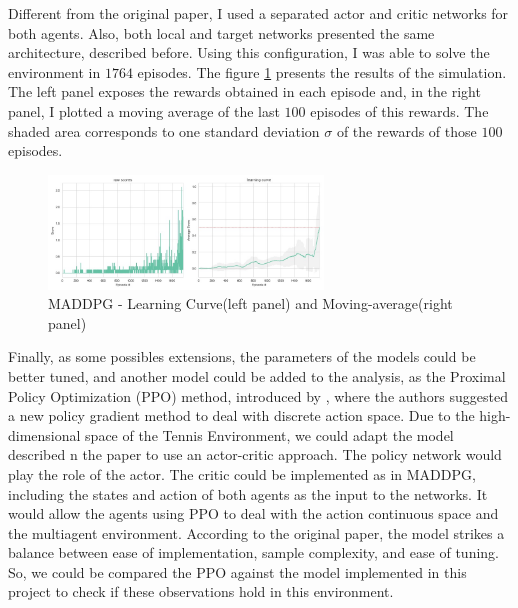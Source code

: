 \documentclass[a4paper]{article}
\begin{document}

Different from the original paper, I used a separated actor and critic networks for both agents. Also, both local and target networks presented the same architecture, described before. Using this configuration, I was able to solve the environment in $1764$ episodes. The figure \ref{fig:ddpg} presents the results of the simulation. The left panel exposes the rewards obtained in each episode and, in the right panel, I plotted a moving average of the last $100$ episodes of this rewards. The shaded area corresponds to one standard deviation $\sigma$ of the rewards of those $100$ episodes.

\begin{figure}[ht]
\centering
\includegraphics[width=0.65\textwidth]{../notebooks/figures/2018-11-07-MADDPG-learning-curve.jpg}
\caption{MADDPG - Learning Curve(left panel) and Moving-average(right panel)}
\label{fig:ddpg}
\end{figure}

Finally, as some possibles extensions, the parameters of the models could be better tuned, and another model could be added to the analysis, as the Proximal Policy Optimization (PPO) method, introduced by \cite{Schulman:2017vq}, where the authors suggested a new policy gradient method to deal with discrete action space. Due to the high-dimensional space of the Tennis Environment, we could adapt the model described n the paper to use an actor-critic approach. The policy network would play the role of the actor. The critic could be implemented as in MADDPG, including the states and action of both agents as the input to the networks. It would allow the agents using PPO to deal with the action continuous space and the multiagent environment. According to the original paper, the model strikes a balance between ease of implementation, sample complexity, and ease of tuning. So, we could be compared the PPO against the model implemented in this project to check if these observations hold in this environment.









\end{document}
